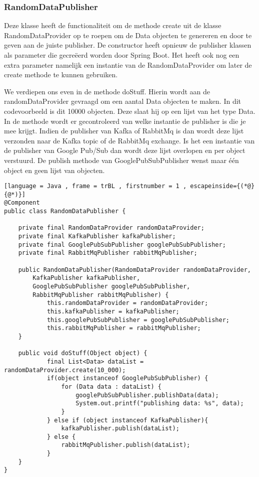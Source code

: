 \subsubsection{RandomDataPublisher}
Deze klasse heeft de functionaliteit om de methode create uit de klasse RandomDataProvider op te roepen om de Data objecten te genereren en door te geven aan de juiste publisher. De constructor heeft opnieuw de publisher klassen als parameter die gecreëerd worden door Spring Boot. Het heeft ook nog een extra parameter namelijk een instantie van de RandomDataProvider om later de create methode te kunnen gebruiken.

We verdiepen ons even in de methode doStuff. Hierin wordt aan de randomDataProvider gevraagd om een aantal Data objecten te maken. In dit codevoorbeeld is dit 10000 objecten. Deze slaat hij op een lijst van het type Data. In de methode wordt er gecontroleerd van welke instantie de publisher is die je mee krijgt. Indien de publisher van Kafka of RabbitMq is dan wordt deze lijst verzonden naar de Kafka topic of de RabbitMq exchange. Is het een instantie van de publisher van Google Pub/Sub dan wordt deze lijst overlopen en per object verstuurd. De publish methode van GooglePubSubPublisher wenst maar één object en geen lijst van objecten.

\begin{lstlisting}[language = Java , frame = trBL , firstnumber = 1 , escapeinside={(*@}{@*)}]
@Component
public class RandomDataPublisher {

    private final RandomDataProvider randomDataProvider;
    private final KafkaPublisher kafkaPublisher;
    private final GooglePubSubPublisher googlePubSubPublisher;
    private final RabbitMqPublisher rabbitMqPublisher;

    public RandomDataPublisher(RandomDataProvider randomDataProvider,
        KafkaPublisher kafkaPublisher,
        GooglePubSubPublisher googlePubSubPublisher,
        RabbitMqPublisher rabbitMqPublisher) {
            this.randomDataProvider = randomDataProvider;
            this.kafkaPublisher = kafkaPublisher;
            this.googlePubSubPublisher = googlePubSubPublisher;
            this.rabbitMqPublisher = rabbitMqPublisher;
    }

    public void doStuff(Object object) {
            final List<Data> dataList = randomDataProvider.create(10_000);
            if(object instanceof GooglePubSubPublisher) {
                for (Data data : dataList) {
                    googlePubSubPublisher.publishData(data);
                    System.out.printf("publishing data: %s", data);
                }
            } else if (object instanceof KafkaPublisher){
                kafkaPublisher.publish(dataList);
            } else {
                rabbitMqPublisher.publish(dataList);
            }
    }
}
\end{lstlisting}
